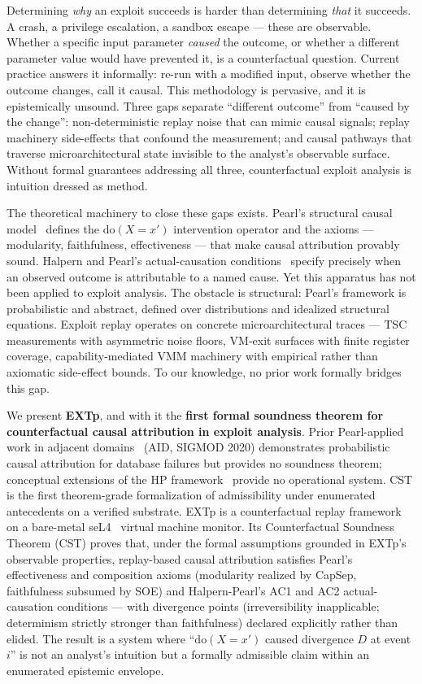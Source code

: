 \documentclass[conference]{IEEEtran}
\newcommand{\dox}[1]{\text{do}(X{=}#1)}
\begin{document}
Determining \emph{why} an exploit succeeds is harder than determining
\emph{that} it succeeds. A crash, a privilege escalation, a sandbox
escape --- these are observable. Whether a specific input parameter
\emph{caused} the outcome, or whether a different parameter value
would have prevented it, is a counterfactual question. Current
practice answers it informally: re-run with a modified input, observe
whether the outcome changes, call it causal. This methodology is
pervasive, and it is epistemically unsound. Three gaps separate
``different outcome'' from ``caused by the change'':
non-deterministic replay noise that can mimic causal signals; replay
machinery side-effects that confound the measurement; and causal
pathways that traverse microarchitectural state invisible to the
analyst's observable surface. Without formal guarantees addressing
all three, counterfactual exploit analysis is intuition dressed as
method.

The theoretical machinery to close these gaps exists. Pearl's
structural causal model~\cite{pearl2009causality} defines the
$\dox{x'}$ intervention operator and the axioms --- modularity,
faithfulness, effectiveness --- that make causal attribution provably
sound. Halpern and Pearl's actual-causation
conditions~\cite{halpern2005causes} specify precisely when an
observed outcome is attributable to a named cause. Yet this apparatus
has not been applied to exploit analysis. The obstacle is structural:
Pearl's framework is probabilistic and abstract, defined over
distributions and idealized structural equations. Exploit replay
operates on concrete microarchitectural traces --- TSC measurements
with asymmetric noise floors, VM-exit surfaces with finite register
coverage, capability-mediated VMM machinery with empirical rather
than axiomatic side-effect bounds. To our knowledge, no prior work
formally bridges this gap.

We present \textbf{EXTp}, and with it the \textbf{first formal
soundness theorem for counterfactual causal attribution in exploit
analysis}. Prior Pearl-applied work in adjacent
domains~\cite{fariha2020aid} (AID, SIGMOD 2020) demonstrates
probabilistic causal attribution for database failures but provides
no soundness theorem; conceptual extensions of the HP
framework~\cite{soloviev2021nested} provide no operational system.
CST is the first theorem-grade formalization of admissibility
under enumerated antecedents on a verified substrate. EXTp is a
counterfactual replay framework on a bare-metal
seL4~\cite{klein2009sel4} virtual machine monitor. Its Counterfactual
Soundness Theorem (CST) proves that, under the formal assumptions
grounded in EXTp's observable properties, replay-based causal
attribution satisfies Pearl's effectiveness and composition axioms
(modularity realized by CapSep, faithfulness subsumed by SOE) and
Halpern-Pearl's AC1 and AC2 actual-causation conditions --- with
divergence points (irreversibility inapplicable; determinism strictly
stronger than faithfulness) declared explicitly rather than elided.
The result is a system where ``$\dox{x'}$ caused divergence $D$ at
event $i$'' is not an analyst's intuition but a formally admissible
claim within an enumerated epistemic envelope.
\end{document}
